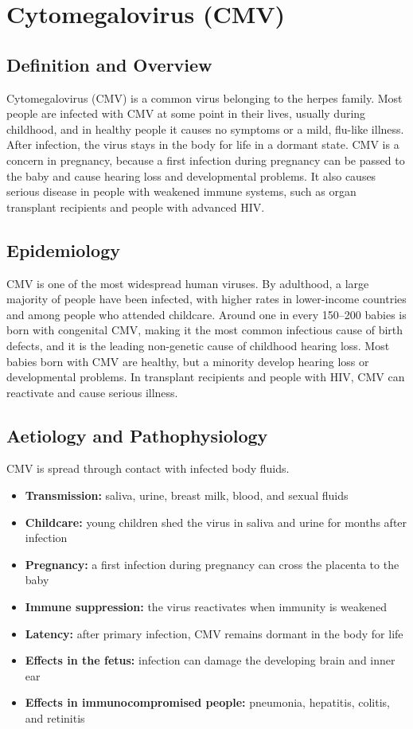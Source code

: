 \chapter{Cytomegalovirus (CMV)}

\section*{Definition and Overview}
Cytomegalovirus (CMV) is a common virus belonging to the herpes family. Most people are infected with CMV at some point in their lives, usually during childhood, and in healthy people it causes no symptoms or a mild, flu-like illness. After infection, the virus stays in the body for life in a dormant state. CMV is a concern in pregnancy, because a first infection during pregnancy can be passed to the baby and cause hearing loss and developmental problems. It also causes serious disease in people with weakened immune systems, such as organ transplant recipients and people with advanced HIV.

\section*{Epidemiology}
CMV is one of the most widespread human viruses. By adulthood, a large majority of people have been infected, with higher rates in lower-income countries and among people who attended childcare. Around one in every 150--200 babies is born with congenital CMV, making it the most common infectious cause of birth defects, and it is the leading non-genetic cause of childhood hearing loss. Most babies born with CMV are healthy, but a minority develop hearing loss or developmental problems. In transplant recipients and people with HIV, CMV can reactivate and cause serious illness.

\section*{Aetiology and Pathophysiology}
CMV is spread through contact with infected body fluids.

\begin{itemize}
    \item \textbf{Transmission:} saliva, urine, breast milk, blood, and sexual fluids
    \item \textbf{Childcare:} young children shed the virus in saliva and urine for months after infection
    \item \textbf{Pregnancy:} a first infection during pregnancy can cross the placenta to the baby
    \item \textbf{Immune suppression:} the virus reactivates when immunity is weakened
    \item \textbf{Latency:} after primary infection, CMV remains dormant in the body for life
    \item \textbf{Effects in the fetus:} infection can damage the developing brain and inner ear
    \item \textbf{Effects in immunocompromised people:} pneumonia, hepatitis, colitis, and retinitis
\end{itemize}

